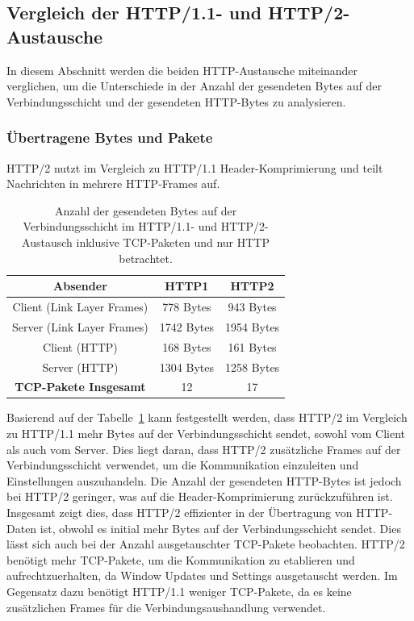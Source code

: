 \FloatBarrier{}
\subsection{Vergleich der HTTP/1.1- und HTTP/2-Austausche}

In diesem Abschnitt werden die beiden HTTP-Austausche miteinander verglichen, um die Unterschiede in der Anzahl der gesendeten Bytes auf der Verbindungsschicht und der gesendeten HTTP-Bytes zu analysieren.

\subsubsection*{Übertragene Bytes und Pakete}

HTTP/2 nutzt im Vergleich zu HTTP/1.1 Header-Komprimierung und teilt Nachrichten in mehrere HTTP-Frames auf.

\begin{table}[ht]
    \centering
    \begin{tabular}{|c|c|c|}
        \hline
        \textbf{Absender} & \textbf{HTTP1} & \textbf{HTTP2} \\
        \hline
        Client (Link Layer Frames) & 778 Bytes & 943 Bytes \\
        Server (Link Layer Frames) & 1742 Bytes & 1954 Bytes \\
        Client (HTTP) & 168 Bytes & 161 Bytes \\
        Server (HTTP) & 1304 Bytes & 1258 Bytes \\
        \hline
        \textbf{TCP-Pakete Insgesamt} & 12 & 17 \\
        \hline
    \end{tabular}
    \caption{Anzahl der gesendeten Bytes auf der Verbindungsschicht im HTTP/1.1- und HTTP/2-Austausch inklusive TCP-Paketen und nur HTTP betrachtet.}\label{tab:bytes}
\end{table}

Basierend auf der Tabelle~\ref{tab:bytes} kann festgestellt werden, dass HTTP/2 im Vergleich zu HTTP/1.1 mehr Bytes auf der Verbindungsschicht sendet, sowohl vom Client als auch vom Server.
Dies liegt daran, dass HTTP/2 zusätzliche Frames auf der Verbindungsschicht verwendet, um die Kommunikation einzuleiten und Einstellungen auszuhandeln.
Die Anzahl der gesendeten HTTP-Bytes ist jedoch bei HTTP/2 geringer, was auf die Header-Komprimierung zurückzuführen ist.
Insgesamt zeigt dies, dass HTTP/2 effizienter in der Übertragung von HTTP-Daten ist, obwohl es initial mehr Bytes auf der Verbindungsschicht sendet.
Dies lässt sich auch bei der Anzahl ausgetauschter TCP-Pakete beobachten.
HTTP/2 benötigt mehr TCP-Pakete, um die Kommunikation zu etablieren und aufrechtzuerhalten, da Window Updates und Settings ausgetauscht werden.
Im Gegensatz dazu benötigt HTTP/1.1 weniger TCP-Pakete, da es keine zusätzlichen Frames für die Verbindungsaushandlung verwendet.

